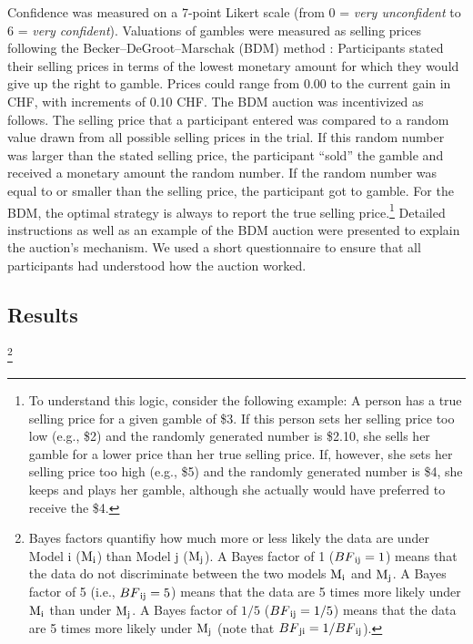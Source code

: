 \documentclass[a4paper, man, natbib, floatsintext]{apa6} %
\begin{document}
Confidence was measured on a 7-point Likert scale (from 0 = \textit{very unconfident} to 6 = \textit{very confident}). Valuations of gambles were measured as selling prices following the Becker--DeGroot--Marschak (BDM) method \citep{Becker1964}: Participants stated their selling prices in terms of the lowest monetary amount for which they would give up the right to gamble. Prices could range from 0.00 to the current gain in CHF, with increments of 0.10 CHF. The BDM auction was incentivized as follows. The selling price that a participant entered was compared to a random value drawn from all possible selling prices in the trial. If this random number was larger than the stated selling price, the participant ``sold'' the gamble and received a monetary amount  the random number. If the random number was equal to or smaller than the selling price, the participant got to gamble. For the BDM, the optimal strategy is always to report the true selling price.\footnote{\label{logic.BDM} 
To understand this logic, consider the following example: A person has a true selling price for a given gamble of \$3. If this person sets her selling price too low (e.g., \$2) and the randomly generated number is \$2.10, she sells her gamble for a lower price than her true selling price. If, however, she sets her selling price too high (e.g., \$5) and the randomly generated number is \$4, she keeps and plays her gamble, although she actually would have preferred to receive the \$4.
} Detailed instructions as well as an example of the BDM auction were presented to explain the auction's mechanism. We used a short questionnaire to ensure that all participants had understood how the auction worked.

\subsection{Results}
\footnote{Bayes factors quantifiy how much more or less likely the data are under Model i ($\mathrm{M}\textsubscript{i}$) than Model j ($\mathrm{M}\textsubscript{j}$). A Bayes factor of 1 ($BF\textsubscript{ij} = 1$) means that the data do not discriminate between the two models $\mathrm{M}\textsubscript{i}$ and $\mathrm{M}\textsubscript{j}$. A Bayes factor of 5 (i.e., $BF\textsubscript{ij} = 5$) means that the data are 5 times more likely under $\mathrm{M}\textsubscript{i}$ than under $\mathrm{M}\textsubscript{j}$. A Bayes factor of $1/5$ ($BF\textsubscript{ij} = 1/5$) means that the data are 5 times more likely under $\mathrm{M}\textsubscript{j}$ (note that $BF\textsubscript{ji} = 1/BF\textsubscript{ij}$).} 
\end{document}
